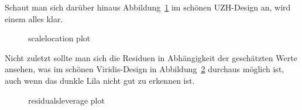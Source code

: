 \documentclass[
  a4paper,
  DIV=11,
  numbers=noendperiod]{scrartcl}
\begin{document}
Schaut man sich darüber hinaus Abbildung~\ref{fig-scaleloc} im schönen
UZH-Design an, wird einem alles klar.

\begin{figure}[H]


\caption{\label{fig-scaleloc}scalelocation plot}

\end{figure}%

Nicht zuletzt sollte man sich die Residuen in Abhängigkeit der
geschätzten Werte ansehen, was im schönen Viridis-Design in
Abbildung~\ref{fig-resfit} durchaus möglich ist, auch wenn das dunkle
Lila nicht gut zu erkennen ist.

\begin{figure}[H]


\caption{\label{fig-resfit}residualsleverage plot}

\end{figure}%
\end{document}
